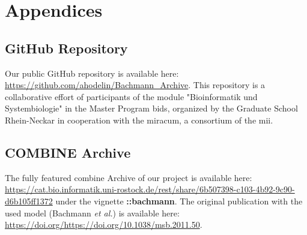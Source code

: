 \section*{Appendices}

\subsection*{GitHub Repository} \label{git}

Our public GitHub repository is available here: \url{https://github.com/ahodelin/Bachmann_Archive}.
This repository is a collaborative effort of participants of the module "Bioinformatik und Systembiologie" in the Master Program \ac{bids}, organized by the Graduate School Rhein-Neckar in cooperation with the \ac{miracum}, a consortium of the \ac{mii}.

\subsection*{COMBINE Archive}

The fully featured \ac{combine} Archive of our project is available here: \url{https://cat.bio.informatik.uni-rostock.de/rest/share/6b507398-c103-4b92-9c90-d6b105ff1372} under the vignette  \textbf{::bachmann}. The original publication with the used model (Bachmann \textit{et al.}) is available here: \url{https://doi.org/https://doi.org/10.1038/msb.2011.50}.